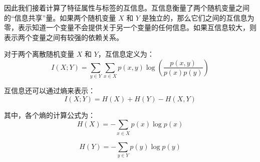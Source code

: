   因此我们接着计算了特征属性与标签的互信息。互信息衡量了两个随机变量之间的“信息共享”量。如果两个随机变量 $X$ 和 $Y$ 是独立的，那么它们之间的互信息为零，表示知道一个变量不会提供关于另一个变量的任何信息。如果互信息较大，则表示两个变量之间有较强的依赖关系。

对于两个离散随机变量 \(X\) 和 \(Y\)，互信息定义为：
\begin{equation}
I(X; Y) = \sum_{y \in Y} \sum_{x \in X} p(x, y) \log \left(\frac{p(x, y)}{p(x) p(y)}\right)
\label{eq:mutual_information}
\end{equation}

互信息还可以通过熵来表示：
\begin{equation}
I(X; Y) = H(X) + H(Y) - H(X, Y)
\label{eq:mutual_information_entropy}
\end{equation}

其中，各个熵的计算公式为：
\begin{equation}
H(X) = -\sum_{x \in X} p(x) \log p(x)
\label{eq:entropy_x}
\end{equation}

\begin{equation}
H(Y) = -\sum_{y \in Y} p(y) \log p(y)
\label{eq:entropy_y}
\end{equation}

